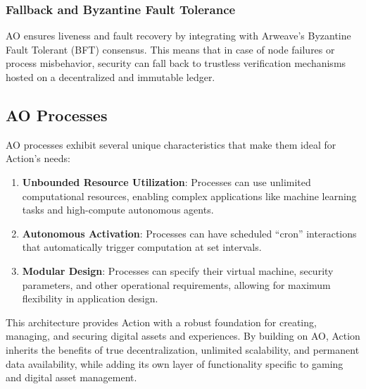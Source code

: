 \subsubsection{Fallback and Byzantine Fault Tolerance}
AO ensures liveness and fault recovery by integrating with Arweave's Byzantine Fault Tolerant (BFT) consensus. This means that in case of node failures or process misbehavior, security can fall back to trustless verification mechanisms hosted on a decentralized and immutable ledger.

\subsection{AO Processes}

AO processes exhibit several unique characteristics that make them ideal for Action's needs:

\begin{enumerate}
\item \textbf{Unbounded Resource Utilization}: Processes can use unlimited computational resources, enabling complex applications like machine learning tasks and high-compute autonomous agents.
\item \textbf{Autonomous Activation}: Processes can have scheduled ``cron'' interactions that automatically trigger computation at set intervals.
\item \textbf{Modular Design}: Processes can specify their virtual machine, security parameters, and other operational requirements, allowing for maximum flexibility in application design.
\end{enumerate}

This architecture provides Action with a robust foundation for creating, managing, and securing digital assets and experiences. By building on AO, Action inherits the benefits of true decentralization, unlimited scalability, and permanent data availability, while adding its own layer of functionality specific to gaming and digital asset management.
